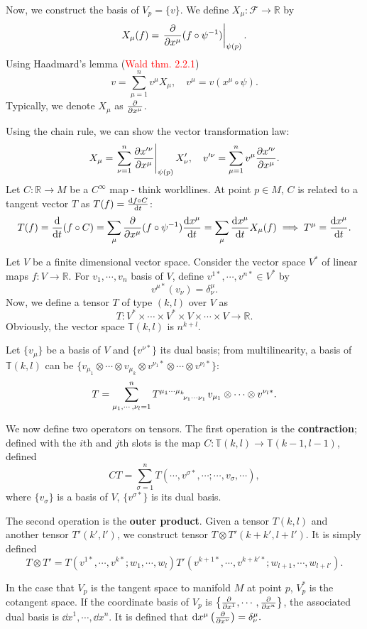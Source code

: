 \documentclass{article}
\begin{document}
Now, we construct the basis of $V_p=\{v\}$. We define $X_\mu:\mathcal F\to\mathbb R$ by 
$$X_\mu(f)=\left. \frac{\partial }{\partial x^\mu}(f\circ\psi^{-1})\right|_{\psi(p)}.$$
Using Haadmard's lemma (\textcolor{red}{Wald thm. 2.2.1})
$$v=\sum^n_{\mu=1}v^\mu X_\mu,\quad v^\mu=v(x^\mu\circ\psi).$$
Typically, we denote $X_\mu$ as $ \frac{\partial }{\partial x^\mu}$. 

Using the chain rule, we can show the vector transformation law:
$$X_\mu=\left.\sum^n_{\nu=1} \frac{\partial x'^\nu}{\partial x^\mu}\right|_{\psi(p)}X'_\nu,\quad v'^\nu=\sum^n_{\mu=1}v^\mu \frac{\partial x'^\nu}{\partial x^\mu}.$$
Let $C:\mathbb R\to M$ be a $C^\infty$ map - think worldlines. At point $p\in M$, $C$ is related to a tangent vector $T$ as $T(f)=\frac{\mathrm{d}f\circ C}{\mathrm{d}t}$:
$$T(f)=\frac{\mathrm{d}}{\mathrm{d}t}(f\circ C)=\sum_\mu \frac{\partial }{\partial x^\mu}(f\circ\psi^{-1})\frac{\mathrm{d}x^\mu}{\mathrm{d}t}=\sum_\mu\frac{\mathrm{d}x^\mu}{\mathrm{d}t}X_\mu(f)\implies T^\mu=\frac{\mathrm{d}x^\mu}{\mathrm{d}t}.$$

Let $V$ be a finite dimensional vector space. Consider the vector space $V^*$ of linear maps $f:V\to\mathbb R$. For $v_1,\cdots,v_n$ basis of $V$, define $v^{1*},\cdots,v^{n*}\in V^*$ by 
$$v^{\mu*}(v_\nu)=\delta^\mu_\nu.$$
Now, we define a tensor $T$ of type $(k,l)$ over $V$ as 
$$T:V^*\times\cdots\times V^*\times V\times\cdots\times V\to\mathbb R.$$
Obviously, the vector space $\mathbb T(k,l)$ is $n^{k+l}$. 

Let $\{v_\mu\}$ be a basis of $V$ and $\{v^{\nu*}\}$ its dual basis; from multilinearity, a basis of $\mathbb T(k,l)$ can be $\{v_{\mu_1}\otimes\cdots\otimes v_{\mu_k}\otimes v^{\nu_1*}\otimes\cdots\otimes v^{\nu_l*}\}$:
$$T=\sum^n_{\mu_1,\cdots,\nu_l=1}T\indices{^{\mu_1\cdots\mu_k}_{\nu_1\cdots\nu_1}}v_{\mu_1}\otimes\cdots\otimes v^{\nu_l*}.$$

We now define two operators on tensors. The first operation is the \textbf{contraction}; defined with the $i$th and $j$th slots is the map $C:\mathbb T(k,l)\to\mathbb T(k-1,l-1)$, defined
$$CT=\sum^n_{\sigma=1}T(\cdots,v^{\sigma*},\cdots;\cdots,v_\sigma,\cdots),$$
where $\{v_\sigma\}$ is a basis of $V$, $\{v^{\sigma*} \}$ is its dual basis.

The second operation is the \textbf{outer product}. Given a tensor $T(k,l)$ and another tensor $T'(k',l')$, we construct tensor $T\otimes T'(k+k',l+l')$. It is simply defined
$$T\otimes T'=T(v^{1*},\cdots,v^{k*};w_1,\cdots,w_l)T'(v^{k+1*},\cdots,v^{k+k'*};w_{l+1},\cdots,w_{l+l'}).$$

In the case that $V_p$ is the tangent space to manifold $M$ at point $p$, $V^*_p$ is the cotangent space. If the coordinate basis of $V_p$ is $\left\{ \frac{\partial }{\partial x^1},\cdots, \frac{\partial }{\partial x^n}\right\}$, the associated dual basis is $\dd x^1,\cdots,\dd x^n$. It is defined that $\dd x^\mu\left( \frac{\partial }{\partial x^\nu}\right)=\delta^\mu_\nu.$
\end{document}
